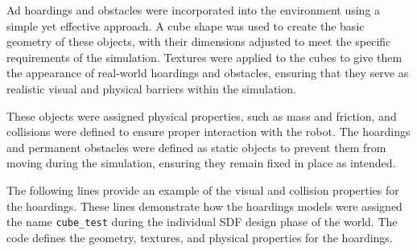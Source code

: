 \documentclass[../../main]{subfiles}
\begin{document}
    Ad hoardings and obstacles were incorporated into the environment using a simple yet effective approach. 
    A cube shape was used to create the basic geometry of these objects, with their dimensions adjusted to meet the specific requirements of the simulation. 
    Textures were applied to the cubes to give them the appearance of real-world hoardings and obstacles, 
    ensuring that they serve as realistic visual and physical barriers within the simulation. 

    These objects were assigned physical properties, such as mass and friction, 
    and collisions were defined to ensure proper interaction with the robot. 
    The hoardings and permanent obstacles were defined as static objects to 
    prevent them from moving during the simulation, ensuring they remain fixed 
    in place as intended. 

    The following lines provide an example of the visual and collision properties for the hoardings. 
    These lines demonstrate how the hoardings models were assigned the name \texttt{cube\_test} during the individual SDF design phase of the world. 
    The code defines the geometry, textures, and physical properties for the hoardings.
\end{document}
